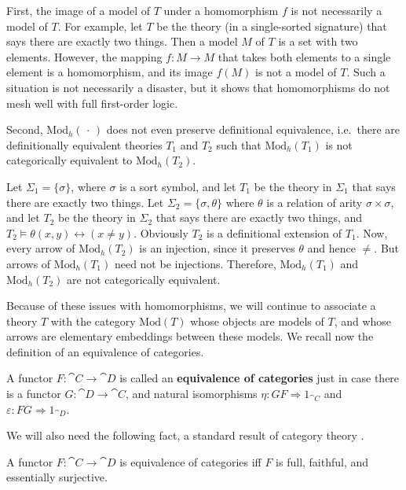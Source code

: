 First, the image of a model of $T$ under a homomorphism $f$ is not
necessarily a model of $T$.  For example, let $T$ be the theory (in a
single-sorted signature) that says there are exactly two things.  Then
a model $M$ of $T$ is a set with two elements.  However, the mapping
$f:M\to M$ that takes both elements to a single element is a
homomorphism, and its image $f(M)$ is not a model of $T$.  Such a
situation is not necessarily a disaster, but it shows that
homomorphisms do not mesh well with full first-order logic.

Second, $\mathrm{Mod}_h(\,\cdot \,)$ does not even preserve
definitional equivalence, i.e.\ there are definitionally equivalent
theories $T_1$ and $T_2$ such that $\mathrm{Mod}_h(T_1)$ is not
categorically equivalent to $\mathrm{Mod}_h(T_2)$.

\begin{example} Let $\Sigma _1 = \{ \sigma \}$, where $\sigma$ is a
  sort symbol, and let $T_1$ be the theory in $\Sigma _1$ that says
  there are exactly two things.  Let
  $\Sigma _2 = \{ \sigma ,\theta \}$ where $\theta$ is a relation of
  arity $\sigma\times\sigma$, and let $T_2$ be the theory in
  $\Sigma _2$ that says there are exactly two things, and
  $T_2\vDash\theta (x,y)\leftrightarrow (x\neq y)$.  Obviously $T_2$
  is a definitional extension of $T_1$.  Now, every arrow of
  $\mathrm{Mod}_h(T_2)$ is an injection, since it preserves $\theta$
  and hence $\neq$.  But arrows of $\mathrm{Mod}_h(T_1)$ need not be
  injections.  Therefore, $\mathrm{Mod}_h(T_1)$ and
  $\mathrm{Mod}_h(T_2)$ are not categorically
  equivalent.  \end{example}

Because of these issues with homomorphisms, we will continue to
associate a theory $T$ with the category $\mathrm{Mod}(T)$ whose
objects are models of $T$, and whose arrows are elementary embeddings
between these models.  We recall now the definition of an equivalence
of categories.

\begin{defn} A functor $F:\cat{C}\rightarrow \cat{D}$ is called an
  \textbf{equivalence of categories} just in case there is a functor
  $G:\cat{D}\to\cat{C}$, and natural isomorphisms
  $\eta :GF\Rightarrow 1_{\cat{C}}$ and
  $\varepsilon :FG\Rightarrow 1_{\cat{D}}$.  \end{defn}

We will also need the following fact, a standard result of category
theory \cite[see][p. 93]{cwm}.

\begin{prop} A functor $F:\cat{C}\to\cat{D}$ is equivalence of
  categories iff $F$ is full, faithful, and essentially
  surjective. \end{prop}

